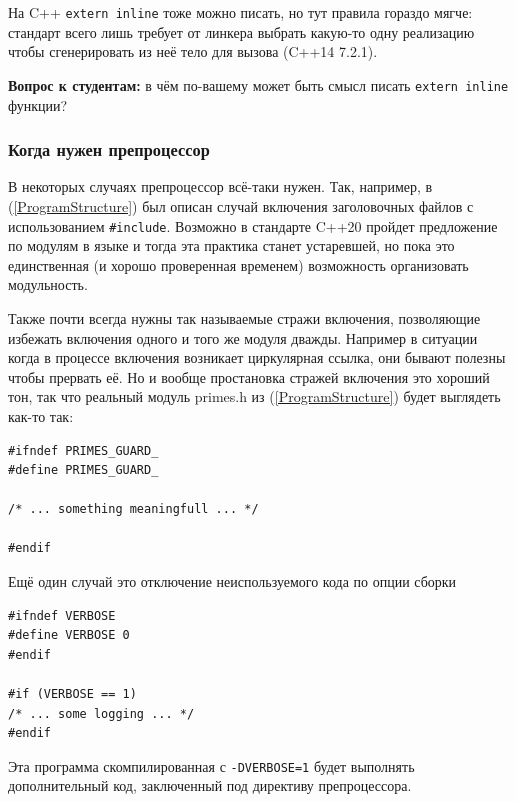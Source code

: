 \documentclass[a4paper,12pt,oneside]{article}
\newif\ifanswers
\begin{document}
На C++ \lstinline!extern inline! тоже можно писать, но тут правила гораздо мягче: стандарт всего лишь требует от линкера выбрать какую-то одну реализацию чтобы сгенерировать из неё тело для вызова (C++14 7.2.1).

\textbf{Вопрос к студентам:} в чём по-вашему может быть смысл писать \lstinline!extern inline! функции?

\ifanswers
Возможный ответ: разница кроется в семантике статических переменных. Внутри \lstinline!static inline! функций создается столько их копий сколько функций, внутри \lstinline!extern inline! копия одна на всех.
\fi

\subsubsection{Когда нужен препроцессор}\label{subsub:preprocuses}

В некоторых случаях препроцессор всё-таки нужен. Так, например, в (\ref{ProgramStructure}) был описан случай включения заголовочных файлов с использованием \lstinline!#include!. Возможно в стандарте C++20 пройдет предложение по модулям в языке и тогда эта практика станет устаревшей, но пока это единственная (и хорошо проверенная временем) возможность организовать модульность.

Также почти всегда нужны так называемые стражи включения, позволяющие избежать включения одного и того же модуля дважды. Например в ситуации когда в процессе включения возникает циркулярная ссылка, они бывают полезны чтобы прервать её. Но и вообще простановка стражей включения это хороший тон, так что реальный модуль primes.h из (\ref{ProgramStructure}) будет выглядеть как-то так:

\begin{lstlisting}
#ifndef PRIMES_GUARD_
#define PRIMES_GUARD_

/* ... something meaningfull ... */

#endif
\end{lstlisting}

Ещё один случай это отключение неиспользуемого кода по опции сборки

\begin{lstlisting}
#ifndef VERBOSE
#define VERBOSE 0
#endif

#if (VERBOSE == 1)
/* ... some logging ... */
#endif
\end{lstlisting}

Эта программа скомпилированная с \lstinline!-DVERBOSE=1! будет выполнять дополнительный код, заключенный под директиву препроцессора.
\end{document}
